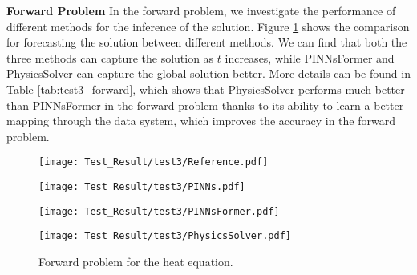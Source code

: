 \documentclass[preprint,11pt]{elsarticle}
\begin{document}
\textbf{Forward Problem}
In the forward problem, we investigate the performance of different methods for the inference of the solution. Figure \ref{fig:test3_forward} shows the comparison for forecasting the solution between different methods. We can find that both the three methods can capture the solution as $t$ increases, while PINNsFormer and PhysicsSolver can capture the global solution better. More details can be found in Table \ref{tab:test3_forward}, which shows that PhysicsSolver performs much better than PINNsFormer in the forward problem thanks to its ability to learn a better mapping through the data system, which improves the accuracy in the forward problem.
\begin{figure}[h]
\centering
    \begin{minipage}[b]{0.49\textwidth}
        \centering
        \texttt{[image: Test\_Result/test3/Reference.pdf]} 
    \end{minipage}
    \begin{minipage}[b]{0.49\textwidth}
        \centering
        \texttt{[image: Test\_Result/test3/PINNs.pdf]} 
    \end{minipage}
    \begin{minipage}[b]{0.49\textwidth}
        \centering
        \texttt{[image: Test\_Result/test3/PINNsFormer.pdf]} 
    \end{minipage}
    \begin{minipage}[b]{0.49\textwidth}
        \centering
        \texttt{[image: Test\_Result/test3/PhysicsSolver.pdf]} 
    \end{minipage}
    \caption{Forward problem for the heat equation.}
    \label{fig:test3_forward}
\end{figure}

\begin{table}[H]
\vspace{-15pt}
    
	\vskip 0.1in
	\centering
	\begin{small}
		\begin{sc}
			\renewcommand{\multirowsetup}{\centering}
			\setlength{\tabcolsep}{5.5pt}
		\end{sc}
	\end{small}
    \caption{Relative $l^2$ errors.}
	\label{tab:test3_forward}
\end{table}
\end{document}
